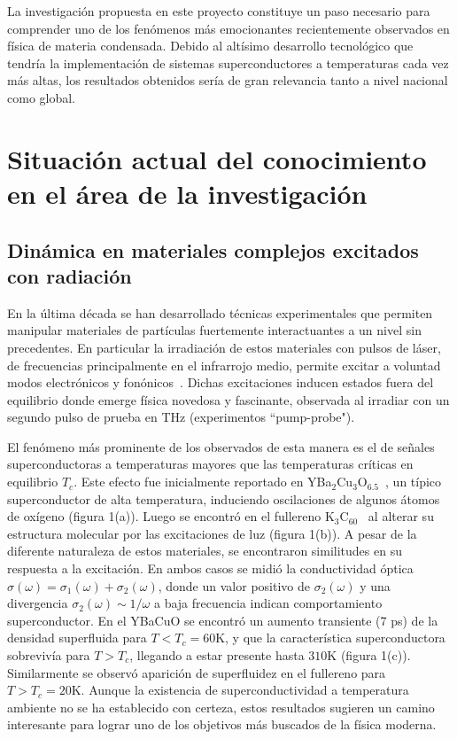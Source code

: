 \documentclass[a4paper,10pt]{article}
\begin{document}
La investigaci\'on propuesta en este proyecto constituye un paso necesario para comprender uno de los fen\'omenos m\'as emocionantes recientemente observados en f\'isica de materia condensada. Debido al alt\'isimo desarrollo tecnol\'ogico que tendr\'ia la implementaci\'on de sistemas superconductores a temperaturas cada vez m\'as altas, los resultados obtenidos ser\'ia de gran relevancia tanto a nivel nacional como global.

\section{Situaci\'on actual del conocimiento en el \'area de la investigaci\'on}

\subsection{Din\'amica en materiales complejos excitados con radiaci\'on}\label{cavalleri}
En la \'ultima d\'ecada se han desarrollado t\'ecnicas experimentales que permiten manipular materiales de part\'iculas fuertemente interactuantes a un nivel sin precedentes. En particular la irradiaci\'on de estos materiales con pulsos de l\'aser, de frecuencias principalmente en el infrarrojo medio, permite excitar a voluntad modos electr\'onicos y fon\'onicos~\cite{mankowski2016rep}. Dichas excitaciones inducen estados fuera del equilibrio donde emerge f\'isica novedosa y fascinante, observada al irradiar con un segundo pulso de prueba en THz (experimentos ``pump-probe"). 

El fen\'omeno m\'as prominente de los observados de esta manera es el de se\~nales superconductoras a temperaturas mayores que las temperaturas cr\'iticas en equilibrio $T_c$. Este efecto fue inicialmente reportado en YBa$_2$Cu$_3$O$_{6.5}$~\cite{hu2014nat}, un t\'ipico superconductor de alta temperatura, induciendo oscilaciones de algunos \'atomos de ox\'igeno (figura 1(a)). Luego se encontr\'o en el fullereno K$_3$C$_{60}$~\cite{mitrano2016nat} al alterar su estructura molecular por las excitaciones de luz (figura 1(b)). A pesar de la diferente naturaleza de estos materiales, se encontraron similitudes en su respuesta a la excitaci\'on. En ambos casos se midi\'o la conductividad \'optica $\sigma(\omega)=\sigma_1(\omega)+\sigma_2(\omega)$, donde un valor positivo de $\sigma_2(\omega)$ y una divergencia $\sigma_2(\omega)\sim1/\omega$ a baja frecuencia indican comportamiento superconductor. En el YBaCuO se encontr\'o un aumento transiente (7 ps) de la densidad superfluida para $T<T_c=60$K, y que la caracter\'istica superconductora sobreviv\'ia para $T>T_c$, llegando a estar presente hasta $310$K (figura 1(c)). Similarmente se observ\'o aparici\'on de superfluidez en el fullereno para $T>T_c=20$K. Aunque la existencia de superconductividad a temperatura ambiente no se ha establecido con certeza, estos resultados sugieren un camino interesante para lograr uno de los objetivos m\'as buscados de la f\'isica moderna.
\end{document}
